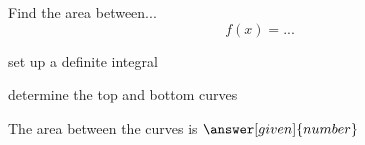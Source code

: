 \documentclass{ximera}
\begin{document}

\begin{center}
\begin{foldable}
\end{foldable}
\end{center}

\begin{problem} %
  Find the area between...
  \[
  f(x) =  ...
  \]
    \begin{hint}
      set up a definite integral
    \end{hint}
    \begin{hint}
      determine the top and bottom curves
    \end{hint}
    
		
		The area between the curves is
		 $\answer[given]{number}$
\end{problem}







\begin{center}
\begin{foldable}
\end{foldable}
\end{center}
\end{document}
